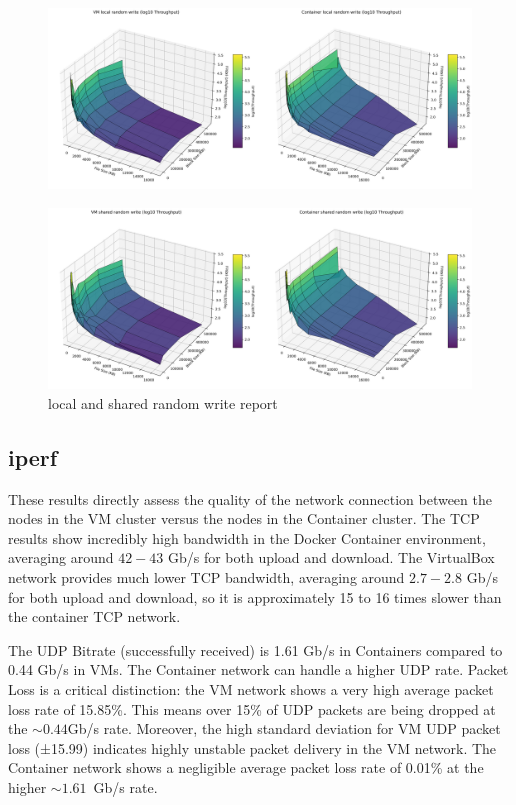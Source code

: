 \begin{figure}[H]
    \centering
    \includegraphics[width=\linewidth]{assets/VM local random write_Container local random write_log_surfaces.png}
        \end{figure}
\begin{figure}[H]
    \centering
    \includegraphics[width=\linewidth]{assets/VM shared random write_Container shared random write_log_surfaces.png}
    \caption{local and shared random write report}
    \label{fig:random write local and shared}
\end{figure}

\subsection{iperf}

These results directly assess the quality of the network connection between the nodes in the VM cluster versus the nodes in the Container cluster. The TCP results show incredibly high bandwidth in the Docker Container environment, averaging around $42-43$ Gb/s for both upload and download. The VirtualBox network provides much lower TCP bandwidth, averaging around $2.7-2.8$ Gb/s for both upload and download, so it is approximately 15 to 16 times slower than the container TCP network.

The UDP Bitrate (successfully received) is 1.61 Gb/s in Containers compared to 0.44 Gb/s in VMs. The Container network can handle a higher UDP rate. Packet Loss is a critical distinction: the VM network shows a very high average packet loss rate of 15.85\%. This means over 15\% of UDP packets are being dropped at the $\sim 0.44 $Gb/s rate. Moreover, the high standard deviation for VM UDP packet loss (±15.99) indicates highly unstable packet delivery in the VM network. The Container network shows a negligible average packet loss rate of 0.01\% at the higher $\sim 1.61$ Gb/s rate. 

